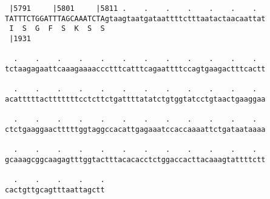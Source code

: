 \documentclass{article}
\begin{document}
\begin{Verbatim}
 |5791     |5801     |5811 .    .    .    .    .    .    .  
TATTTCTGGATTTAGCAAATCTAgtaagtaatgataattttctttaatactaacaattat
 I  S  G  F  S  K  S  S                                     
 |1931                                                      
  
  .    .    .    .    .    .    .    .    .    .    .    .  
tctaagagaattcaaagaaaaccctttcatttcagaattttccagtgaagactttcactt
  
  .    .    .    .    .    .    .    .    .    .    .    .  
acatttttactttttttcctcttctgattttatatctgtggtatcctgtaactgaaggaa
  
  .    .    .    .    .    .    .    .    .    .    .    .  
ctctgaaggaactttttggtaggccacattgagaaatccaccaaaattctgataataaaa
  
  .    .    .    .    .    .    .    .    .    .    .    .  
gcaaagcggcaagagtttggtactttacacacctctggaccacttacaaagtattttctt
  
  .    .    .    .    .
cactgttgcagtttaattagctt
\end{Verbatim}
\newpage
\end{document}
